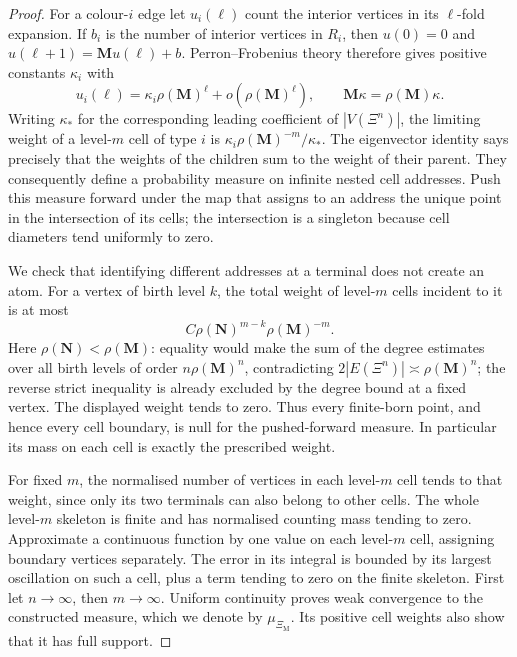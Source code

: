 \documentclass{article}
\theoremstyle{plain}
\theoremstyle{definition}
\begin{document}
\begingroup\color{red}
\begin{proof}
For a colour-$i$ edge let $u_i(\ell)$ count the interior vertices in its
$\ell$-fold expansion. If $b_i$ is the number of interior vertices in $R_i$,
then $u(0)=0$ and $u(\ell+1)=\mathbf M u(\ell)+b$.
Perron--Frobenius theory therefore gives positive constants $\kappa_i$ with
\[
u_i(\ell)=\kappa_i\rho(\mathbf M)^\ell+o(\rho(\mathbf M)^\ell),
\qquad \mathbf M\kappa=\rho(\mathbf M)\kappa.
\]
Writing $\kappa_*$ for the corresponding leading coefficient of
$|V(\Xi^n)|$, the limiting weight of a level-$m$ cell of type $i$ is
$\kappa_i\rho(\mathbf M)^{-m}/\kappa_*$.
The eigenvector identity says precisely that the weights of the children sum
to the weight of their parent. They consequently define a probability measure
on infinite nested cell addresses. Push this measure forward under the map
that assigns to an address the unique point in the intersection of its cells;
the intersection is a singleton because cell diameters tend uniformly to zero.

We check that identifying different addresses at a terminal does not create an atom.
For a vertex of birth level $k$, the total weight of level-$m$ cells incident to it is at most
\[
C\rho(\mathbf N)^{m-k}\rho(\mathbf M)^{-m}.
\]
Here $\rho(\mathbf N)<\rho(\mathbf M)$: equality would make the sum of the
degree estimates over all birth levels of order $n\rho(\mathbf M)^n$,
contradicting $2|E(\Xi^n)|\asymp\rho(\mathbf M)^n$; the reverse strict
inequality is already excluded by the degree bound at a fixed vertex.
The displayed weight tends to zero. Thus every finite-born point, and hence
every cell boundary, is null for the pushed-forward measure. In particular
its mass on each cell is exactly the prescribed weight.

For fixed $m$, the normalised number of vertices in each level-$m$ cell tends
to that weight, since only its two terminals can also belong to other cells.
The whole level-$m$ skeleton is finite and has normalised counting mass tending
to zero. Approximate a continuous function by one value on each level-$m$
cell, assigning boundary vertices separately. The error in its integral is
bounded by its largest oscillation on such a cell, plus a term tending to zero
on the finite skeleton. First let $n\to\infty$, then $m\to\infty$.
Uniform continuity proves weak convergence to the constructed measure, which
we denote by $\mu_{\Xi_{\mathrm M}}$. Its positive cell weights also show that
it has full support.
\end{proof}
\endgroup{}
\end{document}
